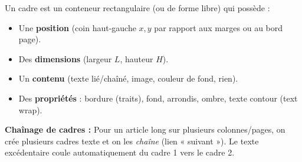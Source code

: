 \documentclass[11pt]{article}
\begin{document}
\begin{definition}
Un cadre est un conteneur rectangulaire (ou de forme libre) qui possède :
\begin{itemize}
    \item Une \textbf{position} (coin haut-gauche $x, y$ par rapport aux marges ou au bord page).
    \item Des \textbf{dimensions} (largeur $L$, hauteur $H$).
    \item Un \textbf{contenu} (texte lié/chaîné, image, couleur de fond, rien).
    \item Des \textbf{propriétés} : bordure (traits), fond, arrondis, ombre, texte contour (text wrap).
\end{itemize}
\textbf{Chaînage de cadres :} Pour un article long sur plusieurs colonnes/pages, on crée plusieurs cadres texte et on les \emph{chaîne} (lien « suivant »). Le texte excédentaire coule automatiquement du cadre 1 vers le cadre 2.
\end{definition}
\end{document}
